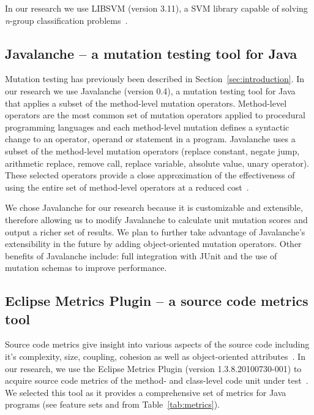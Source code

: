 \documentclass[conference]{IEEEtran}
\begin{document}
In our research we use LIBSVM (version 3.11), a SVM library capable of solving \emph{n}-group classification problems~\cite{CL11}.


\subsection{Javalanche -- a mutation testing tool for Java}
\label{subsec:javalanche}
Mutation testing has previously been described in Section~\ref{sec:introduction}. In our research we use Javalanche (version 0.4), a mutation testing tool for Java~\cite{SZ09} that applies a subset of the method-level mutation operators. Method-level operators are the most common set of mutation operators applied to procedural programming languages and each method-level mutation defines a syntactic change to an operator, operand or statement in a program. Javalanche uses a subset of the method-level mutation operators (replace constant, negate jump, arithmetic replace, remove call, replace variable, absolute value, unary operator). These selected operators provide a close approximation of the effectiveness of using the entire set of method-level operators at a reduced cost~\cite{OLR+96}.

We chose Javalanche for our research because it is customizable and extensible, therefore allowing us to modify Javalanche to calculate unit mutation scores and output a richer set of results. We plan to further take advantage of Javalanche's extensibility in the future by adding object-oriented mutation operators. Other benefits of Javalanche include: full integration with JUnit and the use of mutation schemas to improve performance.

\subsection{Eclipse Metrics Plugin -- a source code metrics tool}
\label{subsec:Metrics}
Source code metrics give insight into various aspects of the source code including it's complexity, size, coupling, cohesion as well as object-oriented attributes~\cite{SCE05,McCa76,Kan02,HWY09,Hend95,SRD12}. In our research, we use the Eclipse Metrics Plugin (version 1.3.8.20100730-001) to acquire source code metrics of the method- and class-level code unit under test~\cite{Metrics}. We selected this tool as it provides a comprehensive set of metrics for Java programs (see feature sets  and  from Table~\ref{tab:metrics}).
\end{document}
